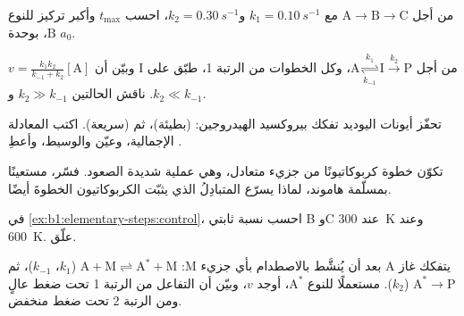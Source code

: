 \begin{exercise}[$\star\star$]\label{exo:b1:elementary-steps:5}
من أجل $\mathrm{A} \to \mathrm{B} \to \mathrm{C}$ مع $k_1 =
\qty{0.10}{s^{-1}}$ و$k_2 = \qty{0.30}{s^{-1}}$، احسب $t_{\max}$
وأكبر تركيز للنوع $\mathrm{B}$، بوحدة $a_0$.
\end{exercise}

\begin{exercise}[$\star\star$]\label{exo:b1:elementary-steps:6}
من أجل $\mathrm{A} \underset{k_{-1}}{\overset{k_1}{\rightleftharpoons}}
\mathrm{I} \xrightarrow{k_2} \mathrm{P}$، وكل الخطوات من الرتبة 1، طبّق
 على $\mathrm{I}$ وبيّن أن $v =
\frac{k_1k_2}{k_{-1} + k_2}[\mathrm{A}]$. ناقش الحالتين $k_2 \gg
k_{-1}$ و$k_2 \ll k_{-1}$.
\end{exercise}

\begin{exercise}[$\star\star$]\label{exo:b1:elementary-steps:7}
تحفّز أيونات اليوديد تفكك بيروكسيد الهيدروجين:
 (بطيئة)، ثم 
(سريعة). اكتب المعادلة الإجمالية، وعيّن 
والوسيط، وأعطِ .
\end{exercise}

\begin{exercise}[$\star\star$]\label{exo:b1:elementary-steps:8}
تكوّن خطوة كربوكاتيونًا من جزيء متعادل، وهي عملية
شديدة الصعود. فسّر، مستعينًا بمسلّمة هاموند، لماذا يسرّع المتبادِلُ الذي
يثبّت الكربوكاتيون الخطوةَ أيضًا.
\end{exercise}

\begin{exercise}[$\star\star$]\label{exo:b1:elementary-steps:9}
في \cref{ex:b1:elementary-steps:control}، احسب نسبة ثابتي  B وC عند \qty{300}{K} وعند \qty{600}{K}.
علّق.
\end{exercise}

\begin{exercise}[$\star\star\star$]\label{exo:b1:elementary-steps:10}
يتفكك غاز $\mathrm{A}$ بعد أن يُنشَّط بالاصطدام بأي
جزيء $\mathrm{M}$: $\mathrm{A} + \mathrm{M} \rightleftharpoons
\mathrm{A}^* + \mathrm{M}$ ($k_1$، $k_{-1}$)، ثم $\mathrm{A}^* \to
\mathrm{P}$ ($k_2$). مستعملًا  للنوع
$\mathrm{A}^*$، أوجد $v$، وبيّن أن التفاعل من الرتبة 1 تحت ضغط
عالٍ ومن الرتبة 2 تحت ضغط منخفض.
\end{exercise}

